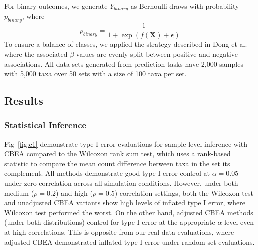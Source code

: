 For binary outcomes, we generate $Y_{binary}$ as Bernoulli draws with probability $p_{binary}$, where 
\begin{equation}
    p_{binary} = \frac{1}{1 + \exp(f(\mathbf{X}) + \mathbf{\epsilon})}
\end{equation}
To ensure a balance of classes, we applied the strategy described in Dong et al. \cite{dong2020predictive} where the associated $\beta$ values are evenly split between positive and negative associations. All data sets generated from prediction tasks have 2,000 samples with 5,000 taxa over 50 sets with a size of 100 taxa per set.

\subsection{Results}

\subsubsection{Statistical Inference}
Fig~\ref{fig:c1} demonstrate type I error evaluations for sample-level inference with CBEA compared to the Wilcoxon rank sum test, which uses a rank-based statistic to compare the mean count difference between taxa in the set its complement. All methods demonstrate good type I error control at $\alpha = 0.05$ under zero correlation across all simulation conditions. However, under both medium ($\rho = 0.2$) and high ($\rho = 0.5$) correlation settings, both the Wilcoxon test and unadjusted CBEA variants show high levels of inflated type I error, where Wilcoxon test performed the worst. On the other hand, adjusted CBEA methods (under both distributions) control for type I error at the appropriate $\alpha$ level even at high correlations. This is opposite from our real data evaluations, where adjusted CBEA demonstrated inflated type I error under random set evaluations.  

